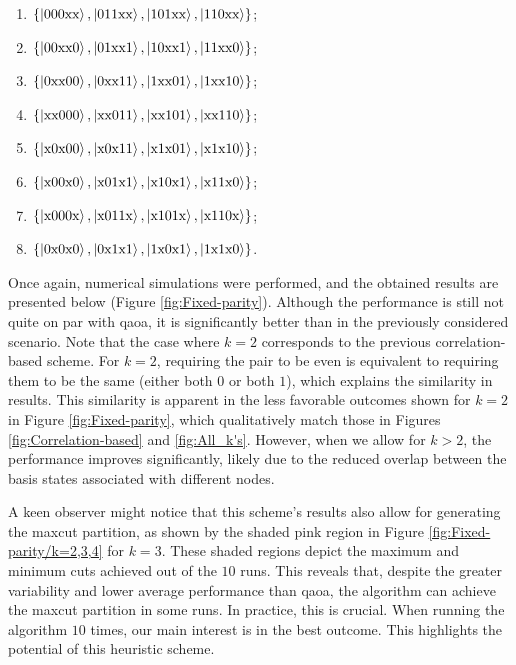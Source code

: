 \begin{multicols}{2}
  \begin{enumerate}
    \item $\left\{\ket{000\text{xx}}, \ket{011\text{xx}}, \ket{101\text{xx}}, \ket{110\text{xx}}\right\}$;
    \item $\left\{\ket{00\text{xx}0}, \ket{01\text{xx}1}, \ket{10\text{xx}1}, \ket{11\text{xx}0}\right\}$;
    \item $\left\{\ket{0\text{xx}00}, \ket{0\text{xx}11}, \ket{1\text{xx}01}, \ket{1\text{xx}10}\right\}$;
    \item $\left\{\ket{\text{xx}000}, \ket{\text{xx}011}, \ket{\text{xx}101}, \ket{\text{xx}110}\right\}$;
    \item $\left\{\ket{\text{x}0\text{x}00}, \ket{\text{x}0\text{x}11}, \ket{\text{x}1\text{x}01}, \ket{\text{x}1\text{x}10}\right\}$;
    \item $\left\{\ket{\text{x}00\text{x}0}, \ket{\text{x}01\text{x}1}, \ket{\text{x}10\text{x}1}, \ket{\text{x}11\text{x}0}\right\}$;
    \item $\left\{\ket{\text{x}000\text{x}}, \ket{\text{x}011\text{x}}, \ket{\text{x}101\text{x}}, \ket{\text{x}110\text{x}}\right\}$;
    \item $\left\{\ket{0\text{x}0\text{x}0}, \ket{0\text{x}1\text{x}1}, \ket{1\text{x}0\text{x}1}, \ket{1\text{x}1\text{x}0}\right\}$.
  \end{enumerate}
\end{multicols}
\noindent Once again, numerical simulations were performed, and the obtained results are presented below (Figure \ref{fig:Fixed-parity}). Although the performance is still not quite on par with \acrshort{qaoa}, it is significantly better than in the previously considered scenario. Note that the case where $k=2$ corresponds to the previous correlation-based scheme. For $k=2$, requiring the pair to be even is equivalent to requiring them to be the same (either both $0$ or both $1$), which explains the similarity in results. This similarity is apparent in the less favorable outcomes shown for $k=2$ in Figure \ref{fig:Fixed-parity}, which qualitatively match those in Figures \ref{fig:Correlation-based} and \ref{fig:All_k's}. However, when we allow for $k>2$, the performance improves significantly, likely due to the reduced overlap between the basis states associated with different nodes.

A keen observer might notice that this scheme's results also allow for generating the \acrshort{maxcut} partition, as shown by the shaded pink region in Figure \ref{fig:Fixed-parity/k=2,3,4} for $k=3$. These shaded regions depict the maximum and minimum cuts achieved out of the $10$ runs. This reveals that, despite the greater variability and lower average performance than \acrshort{qaoa}, the algorithm can achieve the \acrshort{maxcut} partition in some runs. In practice, this is crucial. When running the algorithm $10$ times, our main interest is in the best outcome. This highlights the potential of this heuristic scheme.

